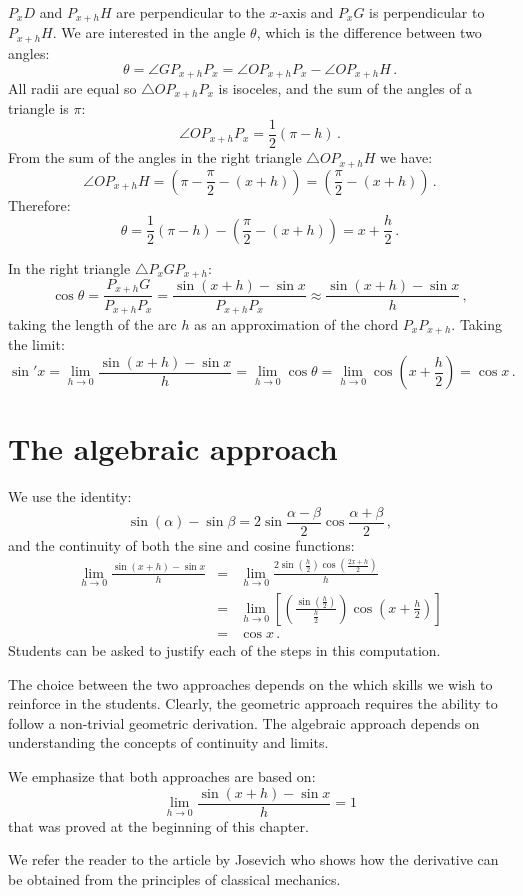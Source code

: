 $P_xD$ and $P_{x+h}H$ are perpendicular to the $x$-axis and $P_xG$ is perpendicular to $P_{x+h}H$.
We are interested in the angle $\theta$, which is the difference between two angles:
\[
\theta=\angle GP_{x+h}P_x= \angle OP_{x+h}P_x - \angle OP_{x+h}H\,.
\]
All radii are equal so $\triangle OP_{x+h}P_x$ is isoceles, and the sum of the angles of a triangle is $\pi$:
\[
\angle OP_{x+h}P_x=\frac{1}{2}(\pi - h)\,.
\]
From the sum of the angles in the right triangle $\triangle OP_{x+h}H$ we have:
\[
\angle OP_{x+h}H = \left(\pi-\frac{\pi}{2}-(x+h)\right) = \left(\frac{\pi}{2}-(x+h)\right)\,.
\]
Therefore:
\[
\theta = \frac{1}{2}(\pi - h) - \left(\frac{\pi}{2}-(x+h)\right) = x+\frac{h}{2}\,.
\]

\smallskip

In the right triangle $\triangle P_xGP_{x+h}$:
\[
\cos \theta = \frac{P_{x+h}G}{P_{x+h}P_x}=\frac{\sin(x+h)\!-\!\sin x}{P_{x+h}P_x}\approx \frac{\sin(x+h)\!-\!\sin x}{h}\,,
\]
taking the length of the arc $h$ as an approximation of the chord $P_xP_{x+h}$. Taking the limit:
\[
\sin' x = \lim_{h\rightarrow 0} \frac{\sin(x+h)\!-\!\sin x}{h} =  \lim_{h\rightarrow 0}\cos \theta = \lim_{h\rightarrow 0} \cos \left(x+\frac{h}{2}\right) = \cos x\,.
\]

\section{The algebraic approach}

We use the identity:
\[
\sin(\alpha) -\sin\beta = 2\sin \frac{\alpha-\beta}{2}\cos \frac{\alpha+\beta}{2}\,,
\]
and the continuity of both the sine and cosine functions:
\begin{eqnarray*}
\lim_{h\rightarrow 0} \frac{\sin(x+h)\!-\!\sin x}{h}&=& \lim_{h\rightarrow 0} \frac{2\sin(\frac{h}{2})\cos(\frac{2x+h}{2})}{h}\\
&=&\lim_{h\rightarrow 0}
  \left[
    \left( 
      \frac{\sin(\frac{h}{2})}{\frac{h}{2}}
    \right)
    \cos\left( x+\frac{h}{2} \right)
   \right]\\
& =& \cos x\,.
\end{eqnarray*}
Students can be asked to justify each of the steps in this computation.

\bigskip

The choice between the two approaches depends on the which skills we wish to reinforce in the students.
Clearly, the geometric approach requires the ability to follow a non-trivial geometric derivation. 
The algebraic approach depends on understanding the concepts of continuity and limits.

We emphasize that both approaches are based on:
\[
\lim_{h\rightarrow 0} \frac{\sin(x+h)\!-\!\sin x}{h} =1
\]
that was proved at the beginning of this chapter.

\bigskip

We refer the reader to the article by Josevich \cite{josevich} who shows how the derivative can be obtained from the principles of classical mechanics.
